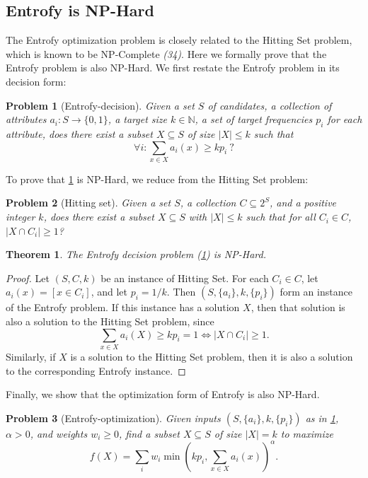 \documentclass[12pt]{article}
\newtheorem{theorem}{Theorem}
\newtheorem{problem}{Problem}
\begin{document}
\subsection*{Entrofy is NP-Hard}
\label{app:nphard}
The Entrofy optimization problem is closely related to the Hitting Set problem, which is known to be NP-Complete \textit{(34)}.%
Here we formally prove that the Entrofy problem is also NP-Hard.
We first restate the Entrofy problem in its decision form:
\begin{problem}[Entrofy-decision]\label{prob:entrofy}
    Given a set $S$ of candidates, a collection of attributes $a_i : S \rightarrow \{0,1\}$, a target size $k \in \mathbb{N}$, a set of target frequencies $p_i$ for each attribute, does there exist a subset $X \subseteq S$ of size $|X|\leq k$ such that
    \begin{equation}
        \forall i : \sum_{x \in X}a_i(x) \geq k p_i~?
    \end{equation}
\end{problem}
To prove that \cref{prob:entrofy} is NP-Hard, we reduce from the Hitting Set problem:
\begin{problem}[Hitting set]\label{prob:hittingset}
    Given a set $S$, a collection $C \subseteq 2^S$, and a positive integer $k$, does there exist a subset $X \subseteq S$ with $|X| \leq k$ such that for all $C_i \in C$, $|X \cap C_i| \geq 1$?
\end{problem}

\begin{theorem}
    The Entrofy decision problem (\cref{prob:entrofy}) is NP-Hard.
\end{theorem}

\begin{proof}
    Let $(S, C, k)$ be an instance of Hitting Set.  For each $C_i \in C$, let $a_i(x) = \left[ x \in C_i \right]$, and let $p_i = 1/k$. 
    Then $(S, \{a_i\}, k, \{p_i\})$ form an instance of the Entrofy problem.  If this instance has a solution $X$, then that solution is also a solution to the Hitting Set problem, since
    \[
    \sum_{x\in X} a_i(X) \geq k p_i = 1 \Leftrightarrow |X \cap C_i| \geq 1.
    \]
    Similarly, if $X$ is a solution to the Hitting Set problem, then it is also a solution to the corresponding Entrofy instance.
\end{proof}

Finally, we show that the optimization form of Entrofy is also NP-Hard.
\begin{problem}[Entrofy-optimization]\label{prob:entrofy-opt}
    Given inputs $(S, \{a_i\}, k, \{p_i\})$ as in \cref{prob:entrofy}, $\alpha > 0$, and weights $w_i \geq 0$, find a subset $X \subseteq S$ of size $|X|=k$ to maximize
    \begin{equation}
        f(X) = \sum_i w_i \min{\left(k p_i, \sum_{x \in X} a_i(x) \right)}^\alpha.\label{eq:entrofy-obj}
    \end{equation}
\end{problem}
\end{document}
